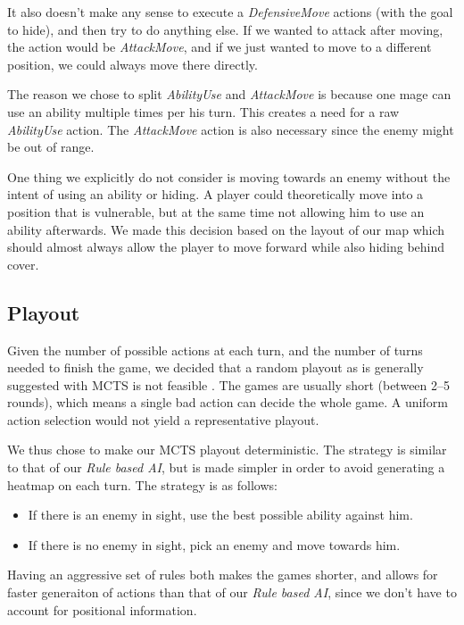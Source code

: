It also doesn't make any sense to execute a \emph{DefensiveMove} actions (with
the goal to hide), and then try to do anything else. If we wanted to attack
after moving, the action would be \emph{AttackMove}, and if we just wanted to
move to a different position, we could always move there directly.

The reason we chose to split \emph{AbilityUse} and \emph{AttackMove} is because one
mage can use an ability multiple times per his turn. This creates a need for a raw
\emph{AbilityUse} action. The \emph{AttackMove} action is also necessary since the enemy
might be out of range.

One thing we explicitly do not consider is moving towards an enemy without the intent
of using an ability or hiding. A player could theoretically move into a position
that is vulnerable, but at the same time not allowing him to use an ability afterwards.
We made this decision based on the layout of our map which should
almost always allow the player to move forward while also hiding behind cover.

\subsection{Playout}

Given the number of possible actions at each turn, and the number of turns
needed to finish the game, we decided that a random playout as is generally
suggested with MCTS is not feasible \citep{mcts-survey}. The games
are usually short (between 2--5 rounds), which means a single bad action can decide
the whole game. A uniform action selection would not yield a representative playout.

We thus chose to make our MCTS playout deterministic. The strategy
is similar to that of our \emph{Rule based AI}, but is made simpler in order
to avoid generating a heatmap on each turn. The strategy is as follows:

\begin{itemize}
\item If there is an enemy in sight, use the best possible ability against him.
\item If there is no enemy in sight, pick an enemy and move towards him.
\end{itemize}

Having an aggressive set of rules both makes the games shorter, and allows for faster
generaiton of actions than that of our \emph{Rule based AI}, since we don't have to account
for positional information.

